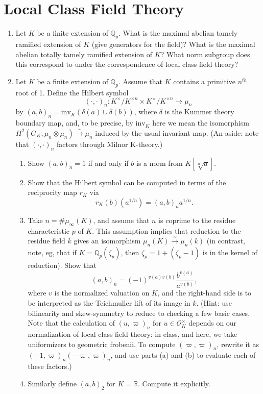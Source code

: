 \documentclass[11pt,answers,addpoints,reqno]{exam}
\theoremstyle{definition}
\theoremstyle{remark}
\theoremstyle{definition}
\theoremstyle{remark}
\theoremstyle{remark}
\theoremstyle{remark}
\newcommand{\Q}{\mathbb{Q}}
\newcommand{\RR}{\mathbb{R}}
\newcommand{\mc}{\mathcal}
\newcommand{\mr}{\mathrm}
\begin{document}
\section{Local Class Field Theory}
\begin{enumerate}
\item Let $K$ be a finite extension of $\Q_p$. What is the maximal abelian tamely ramified extension of $K$ (give generators for the field)? What is the maximal abelian totally tamely ramified extension of $K$? What norm subgroup does this correspond to under the correspondence of local class field theory?
\item Let $K$ be a finite extension of $\Q_p$. Assume that $K$ contains a primitive $n^{th}$ root of 1. Define the Hilbert symbol
\[
(\cdot, \cdot)_n \colon K^\times/K^{\times n} \times K^\times/K^{\times n} \to \mu_n
\]
by $(a, b)_n= \mr{inv}_K(\delta(a) \cup \delta(b))$, where $\delta$ is the Kummer theory boundary map, and, to be precise, by $\mr{inv}_K$ here we mean the isomorphism $H^2(G_K, \mu_n \otimes \mu_n) \xrightarrow{\sim} \mu_n$ induced by the usual invariant map. (An aside: note that $(\cdot, \cdot)_n$ factors through Milnor K-theory.)
\begin{enumerate}
\item Show $(a, b)_n=1$ if and only if $b$ is a norm from $K[\sqrt[n]{a}]$.
\item Show that the Hilbert symbol can be computed in terms of the reciprocity map $r_K$ via
\[
r_K(b)(a^{1/n})= (a, b)_n a^{1/n}.
\]
\item Take $n= \# \mu_{\infty}(K)$, and assume that $n$ is coprime to the residue characteristic $p$ of $K$. This assumption implies that reduction to the residue field $k$ gives an isomorphism $\mu_n(K) \xrightarrow{\sim} \mu_n(k)$ (in contrast, note, eg, that if $K= \Q_p(\zeta_p)$, then $\zeta_p=1 + (\zeta_p-1)$ is in the kernel of reduction). Show that
\[
(a, b)_n= (-1)^{v(a)v(b)} \frac{b^{v(a)}}{a^{v(b)}},
\]
where $v$ is the normalized valuation on $K$, and the right-hand side is to be interpreted as the Teichmuller lift of its image in $k$. (Hint: use bilinearity and skew-symmetry to reduce to checking a few basic cases. Note that the calculation of $(u, \varpi)_n$ for $u \in \mc{O}_K^{\times}$ depends on our normalization of local class field theory: in class, and here, we take uniformizers to geometric frobenii. To compute $(\varpi, \varpi)_n$, rewrite it as $(-1, \varpi)_n(-\varpi, \varpi)_n$, and use parts (a) and (b) to evaluate each of these factors.)
\item Similarly define $(a, b)_2$ for $K= \RR$. Compute it explicitly.

\end{enumerate}
\end{enumerate}
\end{document}

